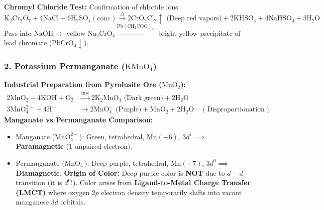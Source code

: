 \documentclass[10pt,a4paper]{article}
\begin{document}
\textbf{Chromyl Chloride Test:} Confirmation of chloride ions:
\begin{equation}
  \mathrm{K_2Cr_2O_7} + 4\mathrm{NaCl} + 6\mathrm{H_2SO_4(conc)} \xrightarrow{\Delta} 2\mathbf{\mathrm{CrO_2Cl_2\uparrow\text{ (Deep red vapors)}}} + 2\mathrm{KHSO_4} + 4\mathrm{NaHSO_4} + 3\mathrm{H_2O}
\end{equation}
Pass into $\mathrm{NaOH} \to$ yellow $\mathrm{Na_2CrO_4} \xrightarrow{\mathrm{Pb(CH_3COO)_2}}$ bright yellow precipitate of lead chromate ($\mathrm{PbCrO_4\downarrow}$).

\subsubsection{2. Potassium Permanganate ($\mathrm{KMnO_4}$)}
\textbf{Industrial Preparation from Pyrolusite Ore ($\mathrm{MnO_2}$):}
\begin{align}
  2\mathrm{MnO_2} + 4\mathrm{KOH} + \mathrm{O_2} &\xrightarrow{\text{fuse}} 2\mathbf{\mathrm{K_2MnO_4\text{ (Dark green)}}} + 2\mathrm{H_2O} \\
  3\mathrm{MnO_4^{2-}} + 4\mathrm{H^+} &\longrightarrow 2\mathbf{\mathrm{MnO_4^-\text{ (Purple)}}} + \mathrm{MnO_2} + 2\mathrm{H_2O} \quad (\text{Disproportionation})
\end{align}
\textbf{Manganate vs Permanganate Comparison:}
\begin{itemize}
  \item Manganate ($\mathrm{MnO_4^{2-}}$): Green, tetrahedral, $\mathrm{Mn(+6)}$, $3d^1 \implies$ \textbf{Paramagnetic} ($1$ unpaired electron).
  \item Permanganate ($\mathrm{MnO_4^-}$): Deep purple, tetrahedral, $\mathrm{Mn(+7)}$, $3d^0 \implies$ \textbf{Diamagnetic}.
  \textbf{Origin of Color:} Deep purple color is \textbf{NOT} due to $d-d$ transition (it is $d^0$!). Color arises from \textbf{Ligand-to-Metal Charge Transfer (LMCT)} where oxygen $2p$ electron density temporarily shifts into vacant manganese $3d$ orbitals.
\end{itemize}
\end{document}
